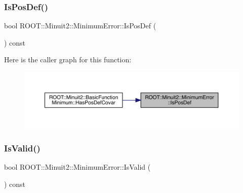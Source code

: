 \mbox{\label{classROOT_1_1Minuit2_1_1MinimumError_afffbed3fdd6785c959ca619a59aaaf74}} 
\subsubsection{\texorpdfstring{IsPosDef()}{IsPosDef()}\hspace{0.1cm}{\footnotesize\ttfamily [3/3]}}
{\footnotesize\ttfamily bool R\+O\+O\+T\+::\+Minuit2\+::\+Minimum\+Error\+::\+Is\+Pos\+Def (\begin{DoxyParamCaption}{ }\end{DoxyParamCaption}) const\hspace{0.3cm}{\ttfamily [inline]}}

Here is the caller graph for this function\+:
\nopagebreak
\begin{figure}[H]
\begin{center}
\leavevmode
\includegraphics[width=350pt]{d5/d32/classROOT_1_1Minuit2_1_1MinimumError_afffbed3fdd6785c959ca619a59aaaf74_icgraph}
\end{center}
\end{figure}
\mbox{\label{classROOT_1_1Minuit2_1_1MinimumError_a0e9a9c525f7ac2e5dc5c7973056a852b}} 
\subsubsection{\texorpdfstring{IsValid()}{IsValid()}\hspace{0.1cm}{\footnotesize\ttfamily [1/3]}}
{\footnotesize\ttfamily bool R\+O\+O\+T\+::\+Minuit2\+::\+Minimum\+Error\+::\+Is\+Valid (\begin{DoxyParamCaption}{ }\end{DoxyParamCaption}) const\hspace{0.3cm}{\ttfamily [inline]}}


